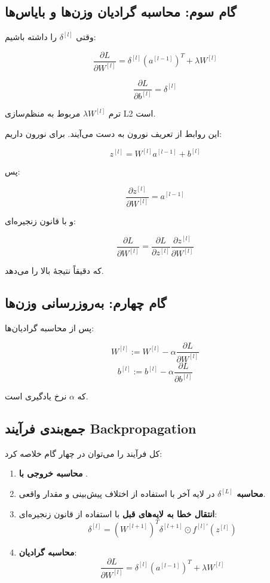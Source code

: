 \documentclass{article}
\begin{document}
\subsection*{گام سوم: محاسبه گرادیان وزن‌ها و بایاس‌ها}

وقتی \(\delta^{[l]}\) را داشته باشیم:

\[
\frac{\partial L}{\partial W^{[l]}}
=
\delta^{[l]} (a^{[l-1]})^T + \lambda W^{[l]}
\]

\[
\frac{\partial L}{\partial b^{[l]}} = \delta^{[l]}
\]

ترم \(\lambda W^{[l]}\) مربوط به منظم‌سازی L2 است.

این روابط از تعریف نورون به دست می‌آیند.  
برای نورون داریم:

\[
z^{[l]} = W^{[l]} a^{[l-1]} + b^{[l]}
\]

پس:

\[
\frac{\partial z^{[l]}}{\partial W^{[l]}}
= a^{[l-1]}
\]

و با قانون زنجیره‌ای:

\[
\frac{\partial L}{\partial W^{[l]}}
=
\frac{\partial L}{\partial z^{[l]}}
\frac{\partial z^{[l]}}{\partial W^{[l]}}
\]

که دقیقاً نتیجهٔ بالا را می‌دهد.

\subsection*{گام چهارم: به‌روزرسانی وزن‌ها}

پس از محاسبه گرادیان‌ها:

\[
W^{[l]} := W^{[l]} - \alpha \frac{\partial L}{\partial W^{[l]}}
\]
\[
b^{[l]} := b^{[l]} - \alpha \frac{\partial L}{\partial b^{[l]}}
\]

که \(\alpha\) نرخ یادگیری است.

\subsection*{جمع‌بندی فرآیند Backpropagation}

کل فرآیند را می‌توان در چهار گام خلاصه کرد:

\begin{enumerate}
	\item \textbf{محاسبه خروجی با }.
	\item \textbf{محاسبه \(\delta^{[L]}\)} در لایه آخر با استفاده از اختلاف پیش‌بینی و مقدار واقعی.
	\item \textbf{انتقال خطا به لایه‌های قبل} با استفاده از قانون زنجیره‌ای:
	\[
	\delta^{[l]} = (W^{[l+1]})^T \delta^{[l+1]} \odot f^{[l]'}(z^{[l]})
	\]
	\item \textbf{محاسبه گرادیان}:
	\[
	\frac{\partial L}{\partial W^{[l]}} = \delta^{[l]} (a^{[l-1]})^T + \lambda W^{[l]}
	\]
\end{enumerate}
\end{document}
